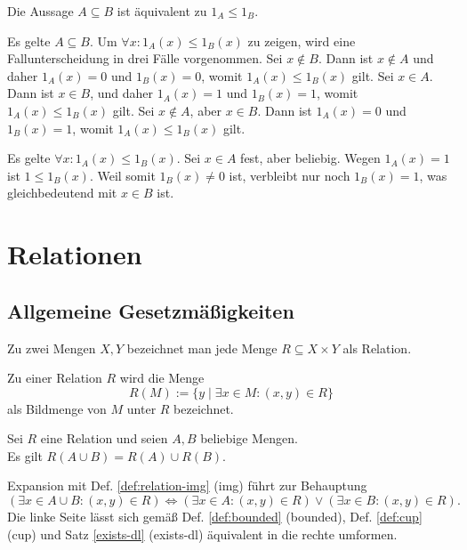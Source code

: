 \begin{Satz}
Die Aussage $A\subseteq B$ ist äquivalent zu $1_A\le 1_B$.
\end{Satz}
\begin{Beweis}
Es gelte $A\subseteq B$. Um $\forall x\colon 1_A(x)\le 1_B(x)$ zu
zeigen, wird eine Fallunterscheidung in drei Fälle vorgenommen.
Sei $x\notin B$. Dann ist $x\notin A$
und daher $1_A(x)=0$ und $1_B(x)=0$, womit $1_A(x)\le 1_B(x)$ gilt.
Sei $x\in A$. Dann ist $x\in B$, und daher $1_A(x)=1$ und $1_B(x)=1$,
womit $1_A(x)\le 1_B(x)$ gilt.
Sei $x\notin A$, aber $x\in B$. Dann ist $1_A(x)=0$ und $1_B(x)=1$,
womit $1_A(x)\le 1_B(x)$ gilt.

Es gelte $\forall x\colon 1_A(x)\le 1_B(x)$. Sei $x\in A$ fest,
aber beliebig. Wegen $1_A(x)=1$ ist $1\le 1_B(x)$. Weil somit
$1_B(x)\ne 0$ ist, verbleibt nur noch $1_B(x)=1$, was
gleichbedeutend mit $x\in B$ ist.\,\qedsymbol
\end{Beweis}

\newpage
\section{Relationen}

\subsection{Allgemeine Gesetzmäßigkeiten}

\begin{Definition}\newlinefirst
Zu zwei Mengen $X,Y$ bezeichnet man
jede Menge $R\subseteq X\times Y$ als Relation.
\end{Definition}
\begin{Definition}\label{def:relation-img}
Zu einer Relation $R$ wird die Menge
\[R(M) := \{y\mid\exists x\in M\colon (x,y)\in R\}\]
als Bildmenge von $M$ unter $R$ bezeichnet.
\end{Definition}

\begin{Satz}
Sei $R$ eine Relation und seien $A,B$ beliebige Mengen.\\
Es gilt $R(A\cup B) = R(A)\cup R(B)$.
\end{Satz}
\begin{Beweis}
Expansion mit Def. \ref{def:relation-img} (img) führt zur Behauptung
\[(\exists x\in A\cup B\colon (x,y)\in R) \iff (\exists x\in A\colon (x,y)\in R)
\lor (\exists x\in B\colon (x,y)\in R).\]
Die linke Seite lässt sich gemäß Def. \ref{def:bounded} (bounded),
Def. \ref{def:cup} (cup) und Satz \ref{exists-dl} (exists-dl)
äquivalent in die rechte umformen.\;\qedsymbol
\end{Beweis}

